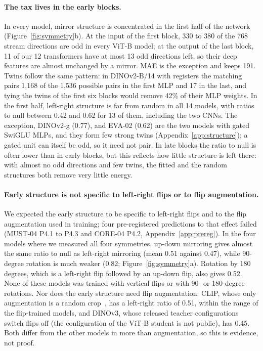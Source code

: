 \paragraph{The tax lives in the early blocks.}
In every model, mirror structure is concentrated in the first half of the network (Figure~\ref{fig:symmetry}b). At the
input of the first block, 330 to 380 of the 768 stream directions are odd in every ViT-B model; at the output of the
last block, 11 of our 12 transformers have at most 13 odd directions left, so their deep features are almost unchanged
by a mirror. MAE is the exception and keeps 191. Twins follow the same pattern: in DINOv2-B/14 with registers the
matching pairs 1{,}168 of the 1{,}536 possible pairs in the first MLP and 17 in the last, and tying the twins of the
first six blocks would remove 42\% of their MLP weights. In the first half, left-right structure is far from random
in all 14 models, with ratios to null between 0.42 and 0.62 for 13 of them, including the two CNNs. The exception,
DINOv2-g (0.77), and EVA-02 (0.62) are the two models with gated SwiGLU MLPs, and they form few strong twins
(Appendix~\ref{app:structure}); a gated unit can itself be odd, so it need not pair. In late blocks the ratio to null
is often lower than in early blocks, but this reflects how little structure is left there: with almost no odd
directions and few twins, the fitted and the random structures both remove very little energy.

\paragraph{Early structure is not specific to left-right flips or to flip augmentation.}
We expected the early structure to be specific to left-right flips and to the flip augmentation used in training;
four pre-registered predictions to that effect failed (MUST-04 P4.1 to P4.3 and CORE-04 P4.2,
Appendix~\ref{app:prereg}). In the four models where we
measured all four symmetries, up-down mirroring gives almost the same ratio to null as left-right mirroring (mean 0.51
against 0.47), while 90-degree rotation is much weaker (0.82; Figure~\ref{fig:symmetry}a). Rotation by 180 degrees,
which is a left-right flip followed by an up-down flip, also gives 0.52. None of these models was trained with
vertical flips or with 90- or 180-degree rotations. Nor does the early structure need flip augmentation: CLIP, whose
only augmentation is a random crop~\citep{radford2021learning}, has a left-right ratio of 0.51, within the range of the
flip-trained models, and DINOv3, whose released teacher configurations switch flips off (the configuration of the
ViT-B student is not public), has 0.45. Both differ from the other models in more than augmentation, so this is
evidence, not proof.

